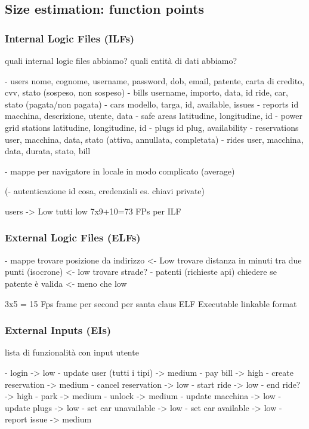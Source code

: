 \documentclass[english]{article}
\begin{document}
\subsection{Size estimation: function points}


\subsubsection{Internal Logic Files (ILFs)}

quali internal logic files abbiamo?
quali entità di dati abbiamo?

- users
nome, cognome, username, password, dob, email, patente, carta di credito, cvv, stato (sospeso, non sospeso)
- bills
username, importo, data, id ride, car, stato (pagata/non pagata)
- cars
modello, targa, id, available, issues
- reports
id macchina, descrizione, utente, data
- safe areas
latitudine, longitudine, id
- power grid stations
latitudine, longitudine, id
- plugs
id plug, availability
- reservations
user, macchina, data, stato (attiva, annullata, completata)
- rides
user, macchina, data, durata, stato, bill

- mappe per navigatore in locale
in modo complicato
(average)

(- autenticazione
id cosa, credenziali es. chiavi private)

users -> Low
tutti low
7x9+10=73 FPs per ILF

\subsubsection{External Logic Files (ELFs)}

- mappe
trovare posizione da indirizzo <- Low
trovare distanza in minuti tra due punti (isocrone) <- low
trovare strade?
- patenti (richieste api)
chiedere se patente è valida <- meno che low

3x5 = 15 Fps frame per second per santa claus ELF Executable linkable format

\subsubsection{External Inputs (EIs)}

lista di funzionalità con input utente

- login -> low
- update user (tutti i tipi) -> medium
- pay bill -> high
- create reservation -> medium
- cancel reservation -> low
- start ride -> low
- end ride? -> high
- park -> medium 
- unlock -> medium
- update macchina -> low
- update plugs -> low
- set car unavailable -> low
- set car available -> low
- report issue -> medium
\end{document}
